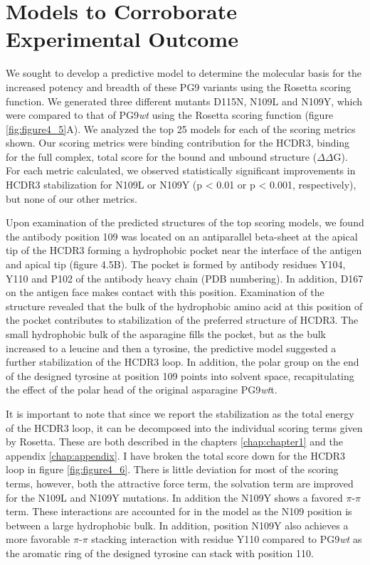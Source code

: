 \section{Models to Corroborate Experimental Outcome}
We sought to develop a predictive model to determine the molecular basis for the increased potency and breadth of these PG9 variants using the Rosetta scoring function. We generated three different mutants D115N, N109L and N109Y, which were compared to that of PG9\textit{wt} using the Rosetta scoring function (figure \ref{fig:figure4_5}A). We analyzed the top 25 models for each of the scoring metrics shown. Our scoring metrics were binding contribution for the HCDR3, binding for the full complex, total score for the bound and unbound structure ($\Delta\Delta$G). For each metric calculated, we observed statistically significant improvements in HCDR3 stabilization for N109L or N109Y (p < 0.01 or p < 0.001, respectively), but none of our other metrics.

Upon examination of the predicted structures of the top scoring models, we found the antibody position 109 was located on an antiparallel beta-sheet at the apical tip of the HCDR3 forming a hydrophobic pocket near the interface of the antigen and apical tip (figure 4.5B). The pocket is formed by antibody residues Y104, Y110 and P102 of the antibody heavy chain (PDB numbering). In addition, D167 on the antigen face makes contact with this position. Examination of the structure revealed that the bulk of the hydrophobic amino acid at this position of the pocket contributes to stabilization of the preferred structure of HCDR3. The small hydrophobic bulk of the asparagine fills the pocket, but as the bulk increased to a leucine and then a tyrosine, the predictive model suggested a further stabilization of the HCDR3 loop. In addition, the polar group on the end of the designed tyrosine at position 109 points into solvent space, recapitulating the effect of the polar head of the original asparagine PG9\textit{wt}t.

It is important to note that since we report the stabilization as the total energy of the HCDR3 loop, it can be decomposed into the individual scoring terms given by Rosetta. These are both described in the chapters \ref{chap:chapter1} and the appendix \ref{chap:appendix}. I have broken the total score down for the HCDR3 loop in figure \ref{fig:figure4_6}. There is little deviation for most of the scoring terms, however, both the attractive force term, the solvation term are improved for the N109L and N109Y mutations. In addition the N109Y shows a favored $\pi$-$\pi$ term. These interactions are accounted for in the model as the N109 position is between a large hydrophobic bulk. In addition, position N109Y also achieves a more favorable $\pi$-$\pi$ stacking interaction with residue Y110 compared to PG9\textit{wt} as the aromatic ring of the designed tyrosine can stack with position 110.

